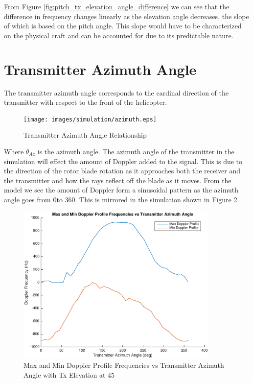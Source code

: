 From Figure \ref{fig:pitch_tx_elevation_angle_difference} we can see that the difference in frequency changes linearly as the elevation angle decreases, the slope of which is based on the pitch angle. This slope would have to be characterized on the physical craft and can be accounted for due to its predictable nature.

\section{Transmitter Azimuth Angle} \label{taa}
The transmitter azimuth angle corresponds to the cardinal direction of the transmitter with respect to the front of the helicopter.

\begin{figure}
	\begin{center}
		\texttt{[image: images/simulation/azimuth.eps]}
		\caption{Transmitter Azimuth Angle Relationship}
		\label{fig:tx_azimuth_rel}
	\end{center}
\end{figure}

Where $\theta_{Az}$ is the azimuth angle. The azimuth angle of the transmitter in the simulation will effect the amount of Doppler added to the signal. This is due to the direction of the rotor blade rotation as it approaches both the receiver and the transmitter and how the rays reflect off the blade as it moves. From the model we see the amount of Doppler form a sinusoidal pattern as the azimuth angle goes from 0\textdegree \space to 360\textdegree. This is mirrored in the simulation shown in Figure \ref{fig:tx_azimuth_angle_200}.

\begin{figure}
	\begin{center}
		\includegraphics[width=10cm]{images/simulation/Azimuth_angle_200_max_doppler.eps}
		\caption{Max and Min Doppler Profile Frequencies vs Transmitter Azimuth Angle with Tx Elevation at 45\textdegree}
		\label{fig:tx_azimuth_angle_200}
	\end{center}
\end{figure}

